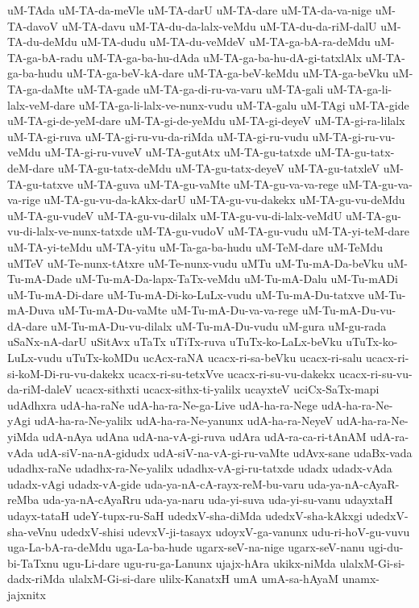 {uM-TAda
uM-TA-da-meVle
uM-TA-darU
uM-TA-dare
uM-TA-da-va-nige
uM-TA-davoV
uM-TA-davu
uM-TA-du-da-lalx-veMdu
uM-TA-du-da-riM-dalU
uM-TA-du-deMdu
uM-TA-dudu
uM-TA-du-veMdeV
uM-TA-ga-bA-ra-deMdu
uM-TA-ga-bA-radu
uM-TA-ga-ba-hu-dAda
uM-TA-ga-ba-hu-dA-gi-tatxlAlx
uM-TA-ga-ba-hudu
uM-TA-ga-beV-kA-dare
uM-TA-ga-beV-keMdu
uM-TA-ga-beVku
uM-TA-ga-daMte
uM-TA-gade
uM-TA-ga-di-ru-va-varu
uM-TA-gali
uM-TA-ga-li-lalx-veM-dare
uM-TA-ga-li-lalx-ve-nunx-vudu
uM-TA-galu
uM-TAgi
uM-TA-gide
uM-TA-gi-de-yeM-dare
uM-TA-gi-de-yeMdu
uM-TA-gi-deyeV
uM-TA-gi-ra-lilalx
uM-TA-gi-ruva
uM-TA-gi-ru-vu-da-riMda
uM-TA-gi-ru-vudu
uM-TA-gi-ru-vu-veMdu
uM-TA-gi-ru-vuveV
uM-TA-gutAtx
uM-TA-gu-tatxde
uM-TA-gu-tatx-deM-dare
uM-TA-gu-tatx-deMdu
uM-TA-gu-tatx-deyeV
uM-TA-gu-tatxleV
uM-TA-gu-tatxve
uM-TA-guva
uM-TA-gu-vaMte
uM-TA-gu-va-va-rege
uM-TA-gu-va-va-rige
uM-TA-gu-vu-da-kAkx-darU
uM-TA-gu-vu-dakekx
uM-TA-gu-vu-deMdu
uM-TA-gu-vudeV
uM-TA-gu-vu-dilalx
uM-TA-gu-vu-di-lalx-veMdU
uM-TA-gu-vu-di-lalx-ve-nunx-tatxde
uM-TA-gu-vudoV
uM-TA-gu-vudu
uM-TA-yi-teM-dare
uM-TA-yi-teMdu
uM-TA-yitu
uM-Ta-ga-ba-hudu
uM-TeM-dare
uM-TeMdu
uMTeV
uM-Te-nunx-tAtxre
uM-Te-nunx-vudu
uMTu
uM-Tu-mA-Da-beVku
uM-Tu-mA-Dade
uM-Tu-mA-Da-lapx-TaTx-veMdu
uM-Tu-mA-Dalu
uM-Tu-mADi
uM-Tu-mA-Di-dare
uM-Tu-mA-Di-ko-LuLx-vudu
uM-Tu-mA-Du-tatxve
uM-Tu-mA-Duva
uM-Tu-mA-Du-vaMte
uM-Tu-mA-Du-va-va-rege
uM-Tu-mA-Du-vu-dA-dare
uM-Tu-mA-Du-vu-dilalx
uM-Tu-mA-Du-vudu
uM-gura
uM-gu-rada
uSaNx-nA-darU
uSitAvx
uTaTx
uTiTx-ruva
uTuTx-ko-LaLx-beVku
uTuTx-ko-LuLx-vudu
uTuTx-koMDu
ucAcx-raNA
ucacx-ri-sa-beVku
ucacx-ri-salu
ucacx-ri-si-koM-Di-ru-vu-dakekx
ucacx-ri-su-tetxVve
ucacx-ri-su-vu-dakekx
ucacx-ri-su-vu-da-riM-daleV
ucacx-sithxti
ucacx-sithx-ti-yalilx
ucayxteV
uciCx-SaTx-mapi
udAdhxra
udA-ha-raNe
udA-ha-ra-Ne-ga-Live
udA-ha-ra-Nege
udA-ha-ra-Ne-yAgi
udA-ha-ra-Ne-yalilx
udA-ha-ra-Ne-yanunx
udA-ha-ra-NeyeV
udA-ha-ra-Ne-yiMda
udA-nAya
udAna
udA-na-vA-gi-ruva
udAra
udA-ra-ca-ri-tAnAM
udA-ra-vAda
udA-siV-na-nA-gidudx
udA-siV-na-vA-gi-ru-vaMte
udAvx-sane
udaBx-vada
udadhx-raNe
udadhx-ra-Ne-yalilx
udadhx-vA-gi-ru-tatxde
udadx
udadx-vAda
udadx-vAgi
udadx-vA-gide
uda-ya-nA-cA-rayx-reM-bu-varu
uda-ya-nA-cAyaR-reMba
uda-ya-nA-cAyaRru
uda-ya-naru
uda-yi-suva
uda-yi-su-vanu
udayxtaH
udayx-tataH
udeY-tupx-ru-SaH‌
udedxV-sha-diMda
udedxV-sha-kAkxgi
udedxV-sha-veVnu
udedxV-shisi
udevxV-ji-tasayx
udoyxV-ga-vanunx
udu-ri-hoV-gu-vuvu
uga-La-bA-ra-deMdu
uga-La-ba-hude
ugarx-seV-na-nige
ugarx-seV-nanu
ugi-du-bi-TaTxnu
ugu-Li-dare
ugu-ru-ga-Lanunx
ujajx-hAra
ukikx-niMda
ulalxM-Gi-si-dadx-riMda
ulalxM-Gi-si-dare
ulilx-KanatxH
umA
umA-sa-hAyaM
unamx-jajxnitx
}
